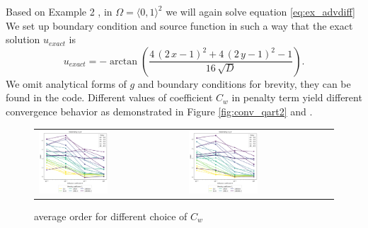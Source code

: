 \begin{example}
\label{ex:quart2}
Based on Example 2 \cite{Antonietti2013},
in $\Omega = \langle 0, 1 \rangle^2$ we will again solve equation \eqref{eq:ex_advdiff}
We set up boundary condition and source function in such a way that the exact 
solution $u_{exact}$ is
\begin{equation}
	u_{exact} =  -\arctan\left(\frac{4 \, {\left(2 \, x - 1\right)}^{2} + 4 \, {\left(2 
	\, y - 1\right)}^{2} - 
	1}{16 \, \sqrt{\mathit{D}}}\right).
\end{equation}
We omit analytical forms of $g$ and boundary conditions for brevity, they can be found in 
the code.
Different values of coefficient $C_w$ in penalty term yield different 
convergence behavior as demonstrated in Figure \ref{fig:conv_qart2} and 
.
\end{example}

\begin{figure}[h!]
\centering
\begin{tabular}{p{} p{}}
	\vspace{0pt} 
	\includegraphics[width=0.49\textwidth]{../figs/parametric/advdiff_2D/ord_quarteroni2_2_4}
	&
	\vspace{0pt} 
	\includegraphics[width=0.49\textwidth]{../figs/parametric/advdiff_2D/ord_quarteroni2_2_3}
\end{tabular}
\caption{ average order for different choice of $C_w$}
\label{fig:orders_quarteroni2}
\end{figure}


